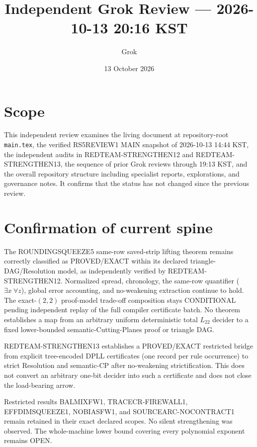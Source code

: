 \documentclass[11pt]{article}
\title{Independent Grok Review --- 2026-10-13 20:16 KST}
\author{Grok}
\date{13 October 2026}
\begin{document}
\maketitle

\begin{center}
\end{center}

\section{Scope}
This independent review examines the living document at repository-root \texttt{main.tex}, the verified RS5REVIEW1 MAIN snapshot of 2026-10-13 14:44 KST, the independent audits in REDTEAM-STRENGTHEN12 and REDTEAM-STRENGTHEN13, the sequence of prior Grok reviews through 19:13 KST, and the overall repository structure including specialist reports, explorations, and governance notes. It confirms that the status has not changed since the previous review.

\section{Confirmation of current spine}
The ROUNDINGSQUEEZE5 same-row saved-strip lifting theorem remains correctly classified as PROVED/EXACT within its declared triangle-DAG/Resolution model, as independently verified by REDTEAM-STRENGTHEN12. Normalized spread, chronology, the same-row quantifier (\(\exists x\ \forall z\)), global error accounting, and no-weakening extraction continue to hold. The exact-$(2,2)$ proof-model trade-off composition stays CONDITIONAL pending independent replay of the full compiler certificate batch. No theorem establishes a map from an arbitrary uniform deterministic total $L_{22}$ decider to a fixed lower-bounded semantic-Cutting-Planes proof or triangle DAG.

REDTEAM-STRENGTHEN13 establishes a PROVED/EXACT restricted bridge from explicit tree-encoded DPLL certificates (one record per rule occurrence) to strict Resolution and semantic-CP after no-weakening strictification. This does not convert an arbitrary one-bit decider into such a certificate and does not close the load-bearing arrow.

Restricted results BALMIXFW1, TRACECR-FIREWALL1, EFFDIMSQUEEZE1, NOBIASFW1, and SOURCEARC-NOCONTRACT1 remain retained in their exact declared scopes. No silent strengthening was observed. The whole-machine lower bound covering every polynomial exponent remains OPEN.
\end{document}
